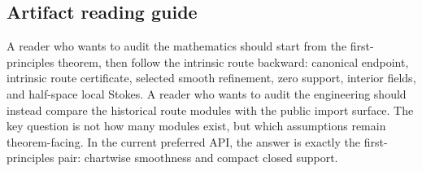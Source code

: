 \subsection{Artifact reading guide}

A reader who wants to audit the mathematics should start from the
first-principles theorem, then follow the intrinsic route backward: canonical
endpoint, intrinsic route certificate, selected smooth refinement, zero support,
interior fields, and half-space local Stokes.  A reader who wants to audit the
engineering should instead compare the historical route modules with the
public import surface.  The key question is not how many modules exist, but
which assumptions remain theorem-facing.  In the current preferred API, the
answer is exactly the first-principles pair: chartwise smoothness and compact
closed support.
